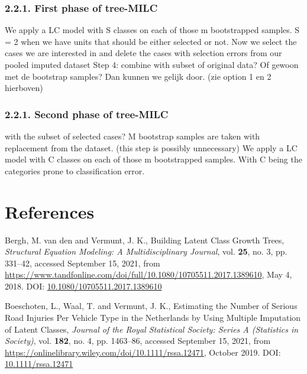 \documentclass[
]{article}
\newlength{\cslhangindent}
\newlength{\cslentryspacingunit} %
\newenvironment{CSLReferences}[2] %
 {%
  \setlength{\parindent}{0pt}
  \ifodd #1
  \let\oldpar\par
  \def\par{\hangindent=\cslhangindent\oldpar}
  \fi
  \setlength{\parskip}{#2\cslentryspacingunit}
 }%
 {}
\begin{document}
\hypertarget{first-phase-of-tree-milc}{%
\subsubsection{2.2.1. First phase of
tree-MILC}\label{first-phase-of-tree-milc}}

We apply a LC model with S classes on each of those m bootstrapped
samples. S = 2 when we have units that should be either selected or not.
Now we select the cases we are interested in and delete the cases with
selection errors from our pooled imputed dataset Step 4: combine with
subset of original data? Of gewoon met de bootstrap samples? Dan kunnen
we gelijk door. (zie option 1 en 2 hierboven)

\hypertarget{second-phase-of-tree-milc}{%
\subsubsection{2.2.1. Second phase of
tree-MILC}\label{second-phase-of-tree-milc}}

with the subset of selected cases? M bootstrap samples are taken with
replacement from the dataset. (this step is possibly unnecessary) We
apply a LC model with C classes on each of those m bootstrapped samples.
With C being the categories prone to classification error.

\hypertarget{references}{%
\section{References}\label{references}}

\setlength{\parindent}{-0.2in}
\setlength{\leftskip}{0.2in}

\noindent

\hypertarget{refs}{}
\begin{CSLReferences}{1}{0}
\leavevmode{}%
Bergh, M. van den and Vermunt, J. K., Building Latent Class Growth
Trees, \emph{Structural Equation Modeling: A Multidisciplinary Journal},
vol. \textbf{25}, no. 3, pp. 331--42, accessed September 15, 2021, from
\url{https://www.tandfonline.com/doi/full/10.1080/10705511.2017.1389610},
May 4, 2018. DOI:
\href{https://doi.org/10.1080/10705511.2017.1389610}{10.1080/10705511.2017.1389610}

\leavevmode{}%
Boeschoten, L., Waal, T. and Vermunt, J. K., Estimating the Number of
Serious Road Injuries Per Vehicle Type in the Netherlands by Using
Multiple Imputation of Latent Classes, \emph{Journal of the Royal
Statistical Society: Series A (Statistics in Society)}, vol.
\textbf{182}, no. 4, pp. 1463--86, accessed September 15, 2021, from
\url{https://onlinelibrary.wiley.com/doi/10.1111/rssa.12471}, October
2019. DOI: \href{https://doi.org/10.1111/rssa.12471}{10.1111/rssa.12471}

\end{CSLReferences}
\end{document}
